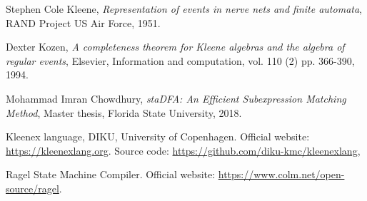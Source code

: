 \documentclass[]{article}
\begin{document}
\begin{thebibliography}{99}
    Stephen Cole Kleene,
    \textit{Representation of events in nerve nets and finite automata},
    RAND Project US Air Force,
    1951.

    Dexter Kozen,
    \textit{A completeness theorem for {Kleene} algebras and the algebra of regular events},
    Elsevier,
    Information and computation,
    vol. 110 (2)
    pp. 366-390,
    1994.

    Mohammad Imran Chowdhury,
    \textit{staDFA: An Efficient Subexpression Matching Method},
    Master thesis,
    Florida State University,
    2018.

    Kleenex language,
    DIKU, University of Copenhagen.
    Official website: \url{https://kleenexlang.org}.
    Source code: \url{https://github.com/diku-kmc/kleenexlang},

    Ragel State Machine Compiler.
    Official website: \url{https://www.colm.net/open-source/ragel}.

\end{thebibliography}
\end{document}
